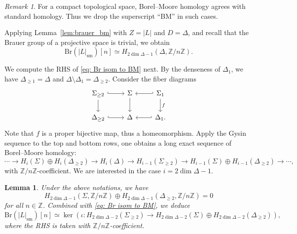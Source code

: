 \documentclass[11pt]{amsart}
\theoremstyle{plain}
\newtheorem{lem}[thm]{Lemma}
\theoremstyle{definition}
\theoremstyle{remark}
\newtheorem{rmk}[thm]{Remark}
\begin{document}
\begin{rmk}
    For a compact topological space, Borel--Moore homology agrees with standard homology. Thus we drop the superscript ``BM'' in such cases.
\end{rmk}

Applying Lemma~\ref{lem:brauer_bm} with $Z = |L|$ and $D = \Delta$, and recall that the Brauer group of a projective space is trivial, we obtain
\begin{equation}\label{eq: Br isom to BM}
\mathrm{Br}(|L|_\mathrm{sm})[n] \simeq H_{2\dim \Delta -1}(\Delta, \mathbb Z/ n\mathbb Z).
\end{equation}

We compute the RHS of \eqref{eq: Br isom to BM} next. By the denseness of $\Delta_1$, we have $\Delta_{\geq 1} = \Delta$ and $\Delta \setminus \Delta_1 = \Delta_{\geq 2}$. Consider the fiber diagrams
\[\begin{tikzcd}
	{\Sigma_{\geq 2}} & \Sigma & {\Sigma_1} \\
	{\Delta_{\geq 2}} & \Delta & {\Delta_1.}
	\arrow[hook, from=1-1, to=1-2]
	\arrow[from=1-1, to=2-1]
	\arrow[from=1-2, to=2-2]
	\arrow[hook', from=1-3, to=1-2]
	\arrow["f", from=1-3, to=2-3]
	\arrow[hook, from=2-1, to=2-2]
	\arrow[hook', from=2-3, to=2-2]
\end{tikzcd}\]
Note that $f$ is a proper bijective map, thus a homeomorphism. Apply the Gysin sequence to the top and bottom rows, one obtains a long exact sequence of Borel--Moore homology:
\[
\cdots \to H_i(\Sigma) \oplus H_i(\Delta_{\geq 2}) \to H_i(\Delta) \to H_{i-1}(\Sigma_{\geq 2}) \to H_{i-1} (\Sigma) \oplus H_{i-1}(\Delta_{\geq 2}) \to \cdots,
\]
with $\mathbb Z/n \mathbb Z$-coefficient. We are interested in the case $i=2\dim \Delta -1$.

\begin{lem}\label{lemma: br isom to ker}
    Under the above notations, we have 
    \[
    H_{2\dim\Delta -1}(\Sigma, \mathbb Z/ n \mathbb Z) \oplus H_{2\dim \Delta -1}(\Delta_{\geq 2}, \mathbb Z/ n \mathbb Z)= 0
    \]
    for all $n \in \mathbb Z$. Combined with \eqref{eq: Br isom to BM}, we deduce 
    \begin{equation}\label{eq: Br isom to ker}
    \mathrm{Br}(|L|_\mathrm{sm})[n]\simeq \ker\left(\iota: H_{2\dim \Delta -2}(\Sigma_{\geq 2}) \to H_{2\dim \Delta-2} (\Sigma) \oplus H_{2\dim \Delta-2}(\Delta_{\geq 2}) \right),
    \end{equation}
    where the RHS is taken with $\mathbb Z/ n\mathbb Z$-coefficient.
\end{lem}
\end{document}
